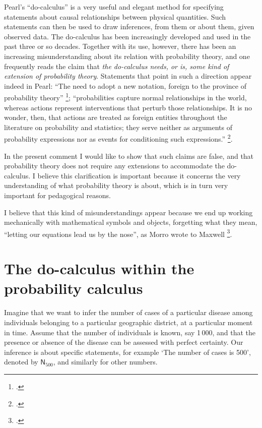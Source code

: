 \documentclass[\ifafour a4paper,12pt,\else a5paper,10pt,\fi%
onecolumn,oneside,article,%
british%
]{memoir}
\theoremstyle{remark}
\theoremstyle{innote}
\newcommand*{\citep}{\footcites}
\renewcommand*{\|}[1][]{\nonscript\:#1\vert\nonscript\:\mathopen{}}
\renewcommand*{\=}{\TextOrMath\texteq\eq}
\newcommand*{\sect}{\S}%
\newcommand*{\chap}{ch.}%
\newcommand*{\yN}{\mathsf{N}}
\newcommand*{\stat}[1]{`#1'}
\begin{document}
Pearl's \enquote{do-calculus} is a very useful and elegant method for
specifying statements about causal relationships between physical
quantities. Such statements can then be used to draw inferences, from them
or about them, given observed data. The do-calculus has been increasingly
developed and used in the past three or so decades. Together with its use,
however, there has been an increasing misunderstanding about its relation
with probability theory, and one frequently reads the claim that \emph{the
  do-calculus needs, or is, some kind of extension of probability theory}.
Statements that point in such a direction appear indeed in Pearl:
\enquote{The need to adopt a new notation, foreign to the province of
  probability theory} \citep[\sect~2.2 p.~23]{pearl2001};
\enquote{probabilities capture normal relationships in the world, whereas
  actions represent interventions that perturb those relationships. It is
  no wonder, then, that actions are treated as foreign entities throughout
  the literature on probability and statistics; they serve neither as
  arguments of probability expressions nor as events for conditioning such
  expressions.} \citep[\sect~4.1 p.~109]{pearl2000_r2009}.

In the present comment I would like to show that such claims are false, and
that probability theory does not require any extensions to accommodate the
do-calculus. I believe this clarification is important because it concerns
the very understanding of what probability theory is about, which is in
turn very important for pedagogical reasons.

I believe that this kind of misunderstandings appear because we end up
working mechanically with mathematical symbols and objects, forgetting what
they mean, \enquote{letting our equations lead us by the nose}, as Morro
wrote to Maxwell \citep[\chap~XII, p.~378]{campbelletal1882}.


\section{The do-calculus within the probability calculus}
\label{sec:docalculus_in_probcalculus}

Imagine that we want to infer the number of cases of a particular disease
among individuals belonging to a particular geographic district, at a
particular moment in time. Assume that the number of individuals is known,
say 1\,000, and that the presence or absence of the disease can be assessed
with perfect certainty. Our inference is about specific statements, for
example \stat{The number of cases is 500}, denoted by $\yN_{500}$, and
similarly for other numbers.
\end{document}
